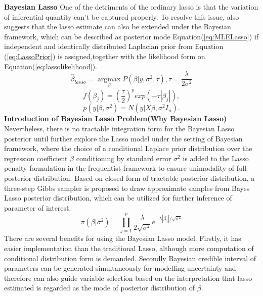 \textbf{Bayesian Lasso}
One of the detriments of the ordinary lasso is that the variation of inferential quantity can't be captured properly. To resolve this issue, \cite{tibshirani_1996} also suggests that the lasso estimate can also be extended under the Bayesian framework, which can be described as posterior mode Equation(\ref{eq:MLELasso}) if independent and identically distributed Laplacian prior from Equation (\ref{eq:LassoPrior}) is assigned,together with the likelihood form on Equation(\ref{eq:lassolikelihood}). 
\begin{equation}
	\label{eq:MLELasso}
	\hat{\beta}_{lasso} = \underset{\beta}{\operatorname{argmax}}P(\beta|y,\sigma^2,\tau), \tau = \frac{\lambda}{2\sigma^2}
\end{equation}
\begin{equation}
	\label{eq:LassoPrior}
	f(\beta_j) = (\frac{\tau}{2})^p exp(-\tau|\beta_j|),
\end{equation}
\begin{equation}
	\label{eq:lassolikelihood}
	p(y |\beta,\sigma^2) = N(y|X\beta,\sigma^2I_n).
\end{equation}
\textbf{Introduction of Bayesian Lasso Problem(Why Bayesian Lasso)}
Nevertheless, there is no tractable integration form for the Bayesian Lasso posterior until \cite{park_casella_2008} further explore the Lasso model under the setting of Bayesian framework, where the choice of a conditional Laplace prior distribution over the regression coefficient $\beta$ conditioning by standard error $\sigma^2$ is added to the Lasso penalty formulation in the frequentist framework to ensure unimodality of full posterior distribution. Based on closed form of tractable posterior distribution, a three-step Gibbs sampler is proposed to draw approximate samples from Bayes Lasso posterior distribution, which can be utilized for further inference of parameter of interest.
\begin{equation}
	\label{eq:lassoprior}
	\pi(\beta |\sigma^2) = \prod_{j=1}^p \frac{\lambda}{2\sqrt{\sigma^2}} e^{-\lambda|\beta_j|/\sqrt{\sigma^2}}
\end{equation}
There are several benefits for using the Bayesian Lasso model. Firstly, it has easier implementation than the traditional Lasso, although more computation of conditional distribution form is demanded. Secondly Bayesian credible interval of parameters can be generated simultaneously for modelling uncertainty and therefore can also guide variable selection based on the interpretation that lasso estimated is regarded as the mode of posterior distribution of $\beta$. 
